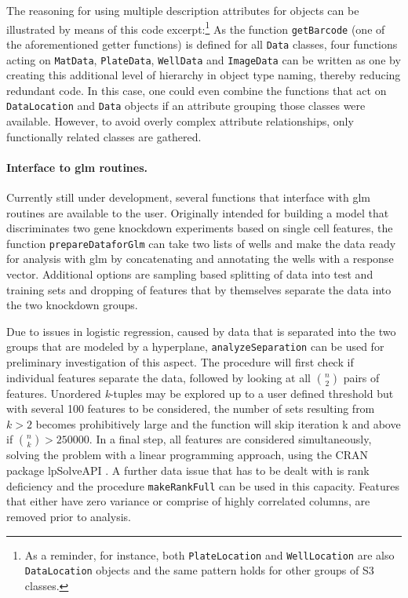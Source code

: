 The reasoning for using multiple description attributes for objects can be illustrated by means of this code excerpt:\footnote{As a reminder, for instance, both \texttt{PlateLocation} and \texttt{WellLocation} are also \texttt{DataLocation} objects and the same pattern holds for other groups of S3 classes.} As the function \texttt{getBarcode} (one of the aforementioned getter functions) is defined for all \texttt{Data} classes, four functions acting on \texttt{MatData}, \texttt{PlateData}, \texttt{WellData} and \texttt{ImageData} can be written as one by creating this additional level of hierarchy in object type naming, thereby reducing redundant code. In this case, one could even combine the functions that act on \texttt{DataLocation} and \texttt{Data} objects if an attribute grouping those classes were available. However, to avoid overly complex attribute relationships, only functionally related classes are gathered.

\paragraph{Interface to \acrshort{glm} routines.}
Currently still under development, several functions that interface with \gls{glm} routines are available to the user. Originally intended for building a model that discriminates two gene knockdown experiments based on single cell features, the function \texttt{prepareDataforGlm} can take two lists of wells and make the data ready for analysis with \gls{glm} by concatenating and annotating the wells with a response vector. Additional options are sampling based splitting of data into test and training sets and dropping of features that by themselves separate the data into the two knockdown groups.

Due to issues in logistic regression, caused by data that is separated into the two groups that are modeled by a hyperplane, \texttt{analyzeSeparation} can be used for preliminary investigation of this aspect. The procedure will first check if individual features separate the data, followed by looking at all $n \choose 2$ pairs of features. Unordered \textit{k}-tuples may be explored up to a user defined threshold but with several 100 features to be considered, the number of sets resulting from $k > 2$ becomes prohibitively large and the function will skip iteration k and above if ${n \choose k} > 250000$. In a final step, all features are considered simultaneously, solving the problem with a linear programming approach, using the CRAN package lpSolveAPI \citep{Konis2007,Konis2014}. A further data issue that has to be dealt with is rank deficiency and the procedure \texttt{makeRankFull} can be used in this capacity. Features that either have zero variance or comprise of highly correlated columns, are removed prior to analysis.

